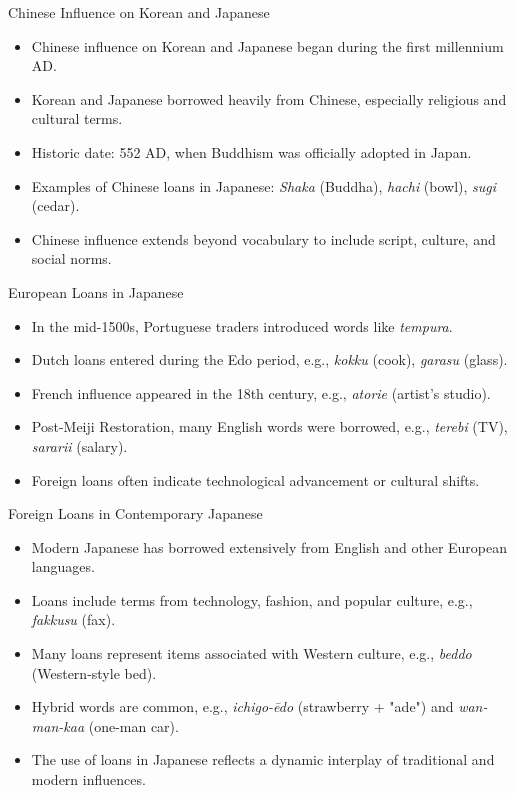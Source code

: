 \documentclass{beamer}
\begin{document}
\begin{frame}{Chinese Influence on Korean and Japanese}
    \begin{itemize}
        \item Chinese influence on Korean and Japanese began during the first millennium AD.
        \item Korean and Japanese borrowed heavily from Chinese, especially religious and cultural terms.
        \item Historic date: 552 AD, when Buddhism was officially adopted in Japan.
        \item Examples of Chinese loans in Japanese: \textit{Shaka} (Buddha), \textit{hachi} (bowl), \textit{sugi} (cedar).
        \item Chinese influence extends beyond vocabulary to include script, culture, and social norms.
    \end{itemize}
\end{frame}

\begin{frame}{European Loans in Japanese}
    \begin{itemize}
        \item In the mid-1500s, Portuguese traders introduced words like \textit{tempura}.
        \item Dutch loans entered during the Edo period, e.g., \textit{kokku} (cook), \textit{garasu} (glass).
        \item French influence appeared in the 18th century, e.g., \textit{atorie} (artist's studio).
        \item Post-Meiji Restoration, many English words were borrowed, e.g., \textit{terebi} (TV), \textit{sararii} (salary).
        \item Foreign loans often indicate technological advancement or cultural shifts.
    \end{itemize}
\end{frame}

\begin{frame}{Foreign Loans in Contemporary Japanese}
    \begin{itemize}
        \item Modern Japanese has borrowed extensively from English and other European languages.
        \item Loans include terms from technology, fashion, and popular culture, e.g., \textit{fakkusu} (fax).
        \item Many loans represent items associated with Western culture, e.g., \textit{beddo} (Western-style bed).
        \item Hybrid words are common, e.g., \textit{ichigo-ēdo} (strawberry + "ade") and \textit{wan-man-kaa} (one-man car).
        \item The use of loans in Japanese reflects a dynamic interplay of traditional and modern influences.
    \end{itemize}
\end{frame}
\end{document}
